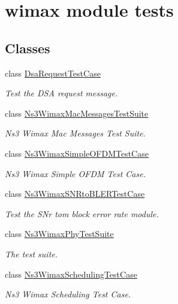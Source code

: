 \hypertarget{group__wimax-test}{}\section{wimax module tests}
\label{group__wimax-test}
\subsection*{Classes}
\begin{DoxyCompactItemize}
\item 
class \hyperlink{classDsaRequestTestCase}{Dsa\+Request\+Test\+Case}
\begin{DoxyCompactList}\small\item\em Test the D\+SA request message. \end{DoxyCompactList}\item 
class \hyperlink{classNs3WimaxMacMessagesTestSuite}{Ns3\+Wimax\+Mac\+Messages\+Test\+Suite}
\begin{DoxyCompactList}\small\item\em Ns3 Wimax Mac Messages Test Suite. \end{DoxyCompactList}\item 
class \hyperlink{classNs3WimaxSimpleOFDMTestCase}{Ns3\+Wimax\+Simple\+O\+F\+D\+M\+Test\+Case}
\begin{DoxyCompactList}\small\item\em Ns3 Wimax Simple O\+F\+DM Test Case. \end{DoxyCompactList}\item 
class \hyperlink{classNs3WimaxSNRtoBLERTestCase}{Ns3\+Wimax\+S\+N\+Rto\+B\+L\+E\+R\+Test\+Case}
\begin{DoxyCompactList}\small\item\em Test the S\+Nr tom block error rate module. \end{DoxyCompactList}\item 
class \hyperlink{classNs3WimaxPhyTestSuite}{Ns3\+Wimax\+Phy\+Test\+Suite}
\begin{DoxyCompactList}\small\item\em The test suite. \end{DoxyCompactList}\item 
class \hyperlink{classNs3WimaxSchedulingTestCase}{Ns3\+Wimax\+Scheduling\+Test\+Case}
\begin{DoxyCompactList}\small\item\em Ns3 Wimax Scheduling Test Case. \end{DoxyCompactList}\item 

\end{DoxyCompactItemize}
